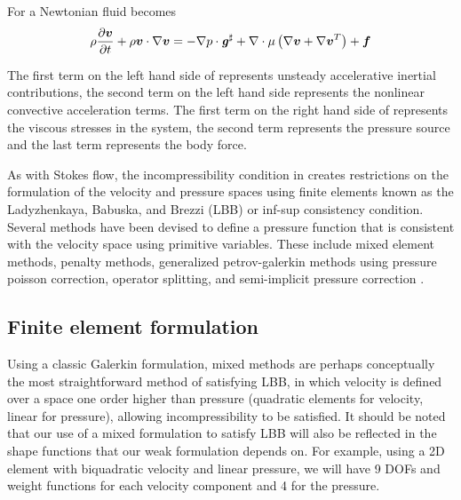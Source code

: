 For a Newtonian fluid  becomes
\begin{equation}
  \rho\delby{\vectr{v}}{t}
  +\dotprod{\rho\vectr{v}}{\gradient{}{\vectr{v}}}
  =\dotprod{-\gradient{}{p}}{\sharptensor{\tensor{g}}}
  +\divergence{}{\mu\pbrac{\gradient{}{\vectr{v}+\transpose{\gradient{}{\vectr{v}}}}}}
  +\vectr{f}
  \label{eqn:DiffIncompNewtonianNSEMomentum}
\end{equation}

The first term on the left hand side of 
represents unsteady accelerative inertial contributions, the second term on
the left hand side represents the nonlinear convective acceleration terms. The
first term on the right hand side of 
represents the viscous stresses in the system, the second term represents the
pressure source and the last term represents the body force.

As with Stokes flow, the incompressibility condition in
 creates restrictions on the formulation of
the velocity and pressure spaces using finite elements known as the
Ladyzhenkaya, Babuska, and Brezzi (LBB) or inf-sup consistency
condition. Several methods have been devised to define a pressure function
that is consistent with the velocity space using primitive variables. These
include mixed element methods, penalty methods, generalized petrov-galerkin
methods using pressure poisson correction, operator splitting, and
semi-implicit pressure correction \cite{chung:2010}.

\subsection{Finite element formulation}

Using a classic Galerkin formulation, mixed methods are perhaps conceptually
the most straightforward method of satisfying LBB, in which velocity is
defined over a space one order higher than pressure (\eg quadratic elements
for velocity, linear for pressure), allowing incompressibility to be
satisfied. It should be noted that our use of a mixed formulation to satisfy
LBB will also be reflected in the shape functions that our weak formulation
depends on. For example, using a 2D element with biquadratic velocity and
linear pressure, we will have 9 DOFs and weight functions for each velocity
component and 4 for the pressure.

